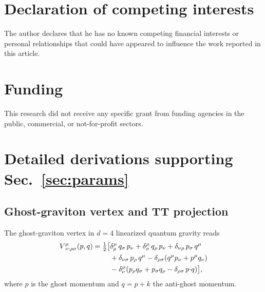 \documentclass[a4paper,fleqn]{cas-dc}
\begin{document}
\section*{Declaration of competing interests}

The author declares that he has no known competing financial
interests or personal relationships that could have appeared
to influence the work reported in this article.

\section*{Funding}

This research did not receive any specific grant from funding
agencies in the public, commercial, or not-for-profit sectors.

\appendix

\section{Detailed derivations supporting Sec.~\ref{sec:params}}
\label{app:derivations}

\subsection{Ghost-graviton vertex and TT projection}
\label{app:tt_vertex}

The ghost-graviton vertex in $d = 4$ linearized quantum gravity
reads~\cite{codello2009}
\begin{align}
V^\mu_{\;\nu;\rho\sigma}(p,q) = \tfrac{1}{2}\big[
  &\delta^\mu_\rho\, q_\sigma\, p_\nu
  + \delta^\mu_\sigma\, q_\rho\, p_\nu
  + \delta_{\nu\rho}\, p_\sigma\, q^\mu
  \notag \\
  &+ \delta_{\nu\sigma}\, p_\rho\, q^\mu
  - \delta_{\rho\sigma}(q^\mu p_\nu + p^\mu q_\nu)
  \notag \\
  &- \delta^\mu_\nu(p_\rho q_\sigma + p_\sigma q_\rho
  - \delta_{\rho\sigma}\,p{\cdot}q)\big],
\label{eq:vertex}
\end{align}
where $p$ is the ghost momentum and $q = p + k$ the anti-ghost
momentum.
\end{document}
